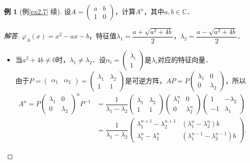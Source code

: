 \documentclass[a4paper,fontset=windows]{ctexbook}
\theoremstyle{definition}
\newtheorem{example}{例}[chapter]
\begin{document}
\begin{example}[例\ref{ex2.7} 续]\label{ex5.5}
设$A=\begin{pmatrix}a&b \\ 1&0\end{pmatrix}$，计算$A^n$，其中$a,b\in\mathbb{C}$．
\end{example}

\begin{proof}[解答]
$\varphi_A(x)=x^2-ax-b$，特征值$\lambda_1=\dfrac{a+\sqrt{a^2+4b}}{2}$，$\lambda_2=\dfrac{a-\sqrt{a^2+4b}}{2}$．

\begin{itemize}
\item 当$a^2+4b\ne 0$时，$\lambda_1\ne\lambda_2$．设$\alpha_i=\begin{pmatrix}\lambda_i \\ 1\end{pmatrix}$是$\lambda_i$对应的特征向量．\\
由于$P=\begin{pmatrix}\alpha_1&\alpha_2\end{pmatrix}=\begin{pmatrix}\lambda_1&\lambda_2 \\ 1&1\end{pmatrix}$是可逆方阵，$AP=P\begin{pmatrix}\lambda_1&0 \\ 0&\lambda_2\end{pmatrix}$，所以
\begin{align*}
A^n=P\begin{pmatrix}\lambda_1&0 \\ 0&\lambda_2\end{pmatrix}^nP^{-1}&=\dfrac{1}{\lambda_1-\lambda_2}\begin{pmatrix}\lambda_1&\lambda_2 \\ 1&1\end{pmatrix}\begin{pmatrix}\lambda_1^n&0 \\ 0&\lambda_2^n\end{pmatrix}\begin{pmatrix}1&-\lambda_2 \\ -1&\lambda_1\end{pmatrix} \\
&=\dfrac{1}{\lambda_1-\lambda_2}\begin{pmatrix}\lambda_1^{n+1}-\lambda_2^{n+1}&(\lambda_1^n-\lambda_2^n)b \\ \lambda_1^n-\lambda_2^n&(\lambda_1^{n-1}-\lambda_2^{n-1})b\end{pmatrix}.
\end{align*}


\end{itemize}
\end{proof}
\end{document}

